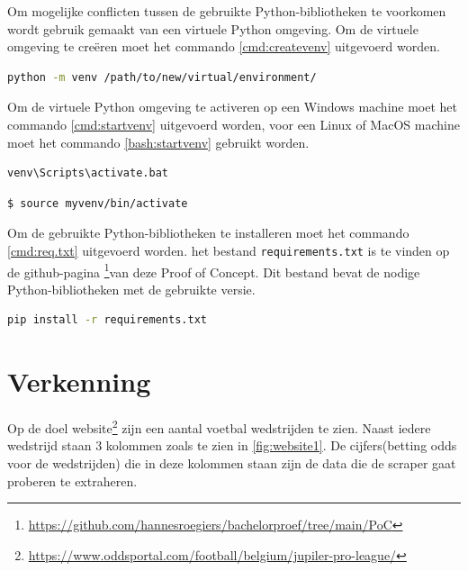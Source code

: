 Om mogelijke conflicten tussen de gebruikte Python-bibliotheken te voorkomen wordt gebruik gemaakt van een virtuele Python omgeving. Om de virtuele omgeving te creëren moet het commando \ref{cmd:createvenv} uitgevoerd worden.

\begin{lstlisting}[language=bash, label={cmd:createvenv}, caption={Het commando om een virtuele Python omgeving te creëren}]
    python -m venv /path/to/new/virtual/environment/
\end{lstlisting}
Om de virtuele Python omgeving te activeren op een Windows machine moet het commando \ref{cmd:startvenv} uitgevoerd worden, voor een Linux of MacOS machine moet het commando \ref{bash:startvenv} gebruikt worden.
\begin{lstlisting}[language=bash, label={cmd:startvenv}, caption={Het commando om een virtuele Python omgeving te activeren op een Windows machine}]
    venv\Scripts\activate.bat
\end{lstlisting}

\begin{lstlisting}[language=bash, label={bash:startvenv}, caption={Het commando om een virtuele Python omgeving te activeren op een Linux of MacOS machine}]
    $ source myvenv/bin/activate
\end{lstlisting}

Om de gebruikte Python-bibliotheken te installeren moet het commando \ref{cmd:req.txt} uitgevoerd worden. het bestand \texttt{requirements.txt} is te vinden op de github-pagina \footnote{\url{https://github.com/hannesroegiers/bachelorproef/tree/main/PoC}}van deze Proof of Concept. Dit bestand bevat de nodige Python-bibliotheken met de gebruikte versie.
\begin{lstlisting}[language=bash, label={cmd:req.txt}, caption={Het commando om de nodige Python-bibliotheken te installeren}]
    pip install -r requirements.txt
\end{lstlisting}

\section{Verkenning}
Op de doel website\footnote{\url{https://www.oddsportal.com/football/belgium/jupiler-pro-league/}} zijn een aantal voetbal wedstrijden te zien. Naast iedere wedstrijd staan 3 kolommen zoals te zien in \ref{fig:website1}. De cijfers(betting odds voor de wedstrijden) die in deze kolommen staan zijn de data die de scraper gaat proberen te extraheren.

